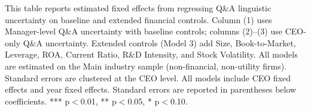 \begin{table}[htbp]
\centering
\caption{Extended Controls Robustness: CEO and Manager Clarity Fixed Effects}
\label{tab:h03_ceo_clarity_extended_complete}

\parbox{\textwidth}{\small
This table reports estimated fixed effects from regressing Q\&A linguistic uncertainty
on baseline and extended financial controls. Column (1) uses Manager-level Q\&A
uncertainty with baseline controls; columns (2)--(3) use CEO-only Q\&A
uncertainty. Extended controls (Model 3) add Size, Book-to-Market, Leverage, ROA,
Current Ratio, R\&D Intensity, and Stock Volatility. All models are estimated on
the Main industry sample (non-financial, non-utility firms). Standard errors are
clustered at the CEO level. All models include CEO fixed effects and year fixed
effects. Standard errors are reported in parentheses below coefficients.
*** p$<$0.01, ** p$<$0.05, * p$<$0.10.
}

\vspace{0.5em}


\end{table}
